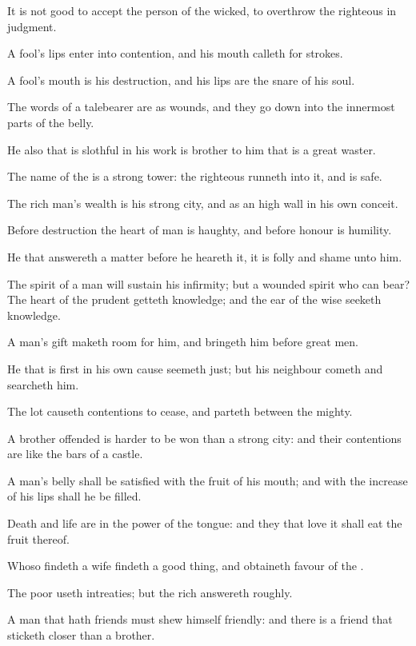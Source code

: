 \verse It is not good to accept the person of the wicked, to overthrow the righteous in judgment.

\verse A fool's lips enter into contention, and his mouth calleth for strokes.

\verse A fool's mouth is his destruction, and his lips are the snare of his soul.

\verse The words of a talebearer are as wounds, and they go down into the innermost parts of the belly.

\verse He also that is slothful in his work is brother to him that is a great waster.

\verse The name of the \LORD is a strong tower: the righteous runneth into it, and is safe.

\verse The rich man's wealth is his strong city, and as an high wall in his own conceit.

\verse Before destruction the heart of man is haughty, and before honour is humility.

\verse He that answereth a matter before he heareth it, it is folly and shame unto him.

\verse The spirit of a man will sustain his infirmity; but a wounded spirit who can bear?  \verse The heart of the prudent getteth knowledge; and the ear of the wise seeketh knowledge.

\verse A man's gift maketh room for him, and bringeth him before great men.

\verse He that is first in his own cause seemeth just; but his neighbour cometh and searcheth him.

\verse The lot causeth contentions to cease, and parteth between the mighty.

\verse A brother offended is harder to be won than a strong city: and their contentions are like the bars of a castle.

\verse A man's belly shall be satisfied with the fruit of his mouth; and with the increase of his lips shall he be filled.

\verse Death and life are in the power of the tongue: and they that love it shall eat the fruit thereof.

\verse Whoso findeth a wife findeth a good thing, and obtaineth favour of the \LORD.

\verse The poor useth intreaties; but the rich answereth roughly.

\verse A man that hath friends must shew himself friendly: and there is a friend that sticketh closer than a brother.


